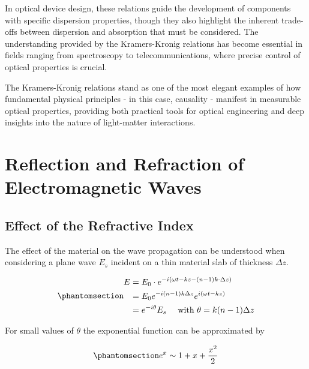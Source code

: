 \documentclass[
  a4paper,
]{book}
\begin{document}
\begin{tcolorbox}
In optical device design, these relations guide the development of
components with specific dispersion properties, though they also
highlight the inherent trade-offs between dispersion and absorption that
must be considered. The understanding provided by the Kramers-Kronig
relations has become essential in fields ranging from spectroscopy to
telecommunications, where precise control of optical properties is
crucial.

The Kramers-Kronig relations stand as one of the most elegant examples
of how fundamental physical principles - in this case, causality -
manifest in measurable optical properties, providing both practical
tools for optical engineering and deep insights into the nature of
light-matter interactions.

\end{tcolorbox}

\chapter{Reflection and Refraction of Electromagnetic
Waves}\label{reflection-and-refraction-of-electromagnetic-waves}

\section{Effect of the Refractive
Index}\label{effect-of-the-refractive-index}

The effect of the material on the wave propagation can be understood
when considering a plane wave \(E_s\) incident on a thin material slab
of thickness \(\Delta z\).

\begin{equation}\phantomsection\label{eq-wave-slab}{
\begin{aligned}
E & =E_0 \cdot e^{-i(\omega t-k z-(n-1) k \cdot \Delta z)} \\
& =E_0 e^{-i(n-1) k \Delta z} e^{i(\omega t-k z)} \\
& =e^{-i \theta} E_s \quad \text { with } \theta=k(n-1) \Delta z
\end{aligned}
}\end{equation}

For small values of \(\theta\) the exponential function can be
approximated by

\begin{equation}\phantomsection\label{eq-exp-approx}{e^x \sim 1+x+\frac{x^2}{2}}\end{equation}
\end{document}
